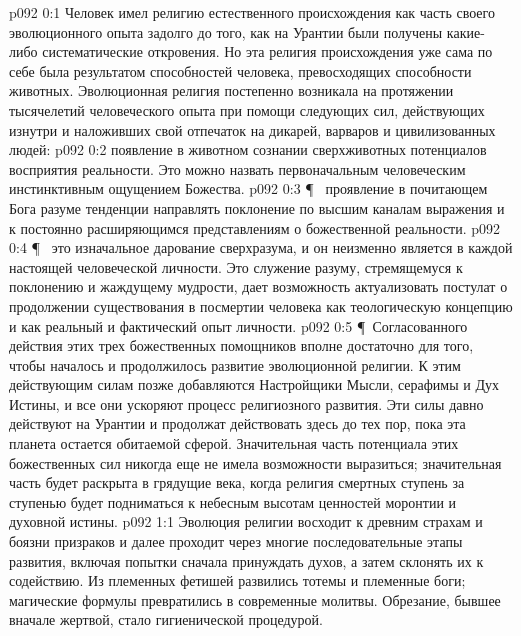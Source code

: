 \author{Мелхиседек}
\vs p092 0:1 Человек имел религию естественного происхождения как часть своего эволюционного опыта задолго до того, как на Урантии были получены какие\hyp{}либо систематические откровения. Но эта религия  происхождения уже сама по себе была результатом способностей человека, превосходящих способности животных. Эволюционная религия постепенно возникала на протяжении тысячелетий человеческого опыта при помощи следующих сил, действующих изнутри и наложивших свой отпечаток на дикарей, варваров и цивилизованных людей:
\vs p092 0:2 \bibnobreakspace {} появление в животном сознании сверхживотных потенциалов восприятия реальности. Это можно назвать первоначальным человеческим инстинктивным ощущением Божества.
\vs p092 0:3 \P\ \bibnobreakspace {} проявление в почитающем Бога разуме тенденции направлять поклонение по высшим каналам выражения и к постоянно расширяющимся представлениям о божественной реальности.
\vs p092 0:4 \P\ \bibnobreakspace {} это изначальное дарование сверхразума, и он неизменно является в каждой настоящей человеческой личности. Это служение разуму, стремящемуся к поклонению и жаждущему мудрости, дает возможность актуализовать постулат о продолжении существования в посмертии человека как теологическую концепцию и как реальный и фактический опыт личности.
\vs p092 0:5 \P\ Согласованного действия этих трех божественных помощников вполне достаточно для того, чтобы началось и продолжилось развитие эволюционной религии. К этим действующим силам позже добавляются Настройщики Мысли, серафимы и Дух Истины, и все они ускоряют процесс религиозного развития. Эти силы давно действуют на Урантии и продолжат действовать здесь до тех пор, пока эта планета остается обитаемой сферой. Значительная часть потенциала этих божественных сил никогда еще не имела возможности выразиться; значительная часть будет раскрыта в грядущие века, когда религия смертных ступень за ступенью будет подниматься к небесным высотам ценностей моронтии и духовной истины.
\vs p092 1:1 Эволюция религии восходит к древним страхам и боязни призраков и далее проходит через многие последовательные этапы развития, включая попытки сначала принуждать духов, а затем склонять их к содействию. Из племенных фетишей развились тотемы и племенные боги; магические формулы превратились в современные молитвы. Обрезание, бывшее вначале жертвой, стало гигиенической процедурой.
